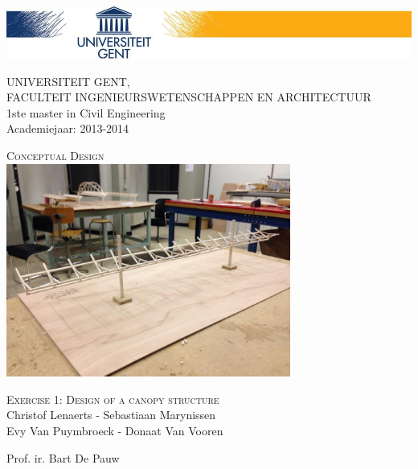 \documentclass[a4paper]{article}
\begin{document}
\begin{titlepage}
\includegraphics[width=\textwidth]{Hoofding.png}
\begin{flushleft}
UNIVERSITEIT GENT,\\
FACULTEIT INGENIEURSWETENSCHAPPEN EN ARCHITECTUUR\\
1ste master in Civil Engineering\\
Academiejaar: 2013-2014
\end{flushleft}

\begin{center}

\vspace*{\fill}

\textsc{\huge Conceptual Design}\\
[1.5cm]
\includegraphics[width=0.7\textwidth]{ons.jpg}

\vspace{1.5cm}

\textsc{\LARGE Exercise 1: Design of a canopy structure}\\
[1cm]
Christof Lenaerts - Sebastiaan Marynissen \\
Evy Van Puymbroeck - Donaat Van Vooren
\vspace*{\fill}

\end{center}

\begin{flushbottom}
\begin{flushleft}
Prof. ir. Bart De Pauw \\
\end{flushleft}
\end{flushbottom}

\end{titlepage}
\end{document}
